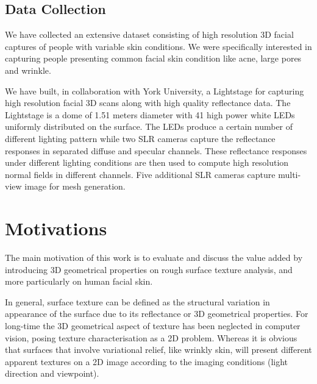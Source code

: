 \subsection{Data Collection}\label{intro_data_collection}
We have collected an extensive dataset consisting of high resolution 3D facial captures of people with variable skin conditions. We were specifically interested in capturing people presenting common facial skin condition like acne, large pores and wrinkle.

We have built, in collaboration with York University, a Lightstage for capturing high resolution facial 3D scans along with high quality reflectance data. The Lightstage is a dome of 1.51 meters diameter with 41 high power white LEDs uniformly distributed on the surface. The LEDs produce a certain number of different lighting pattern while two SLR cameras capture the reflectance responses in separated diffuse and specular channels. These reflectance responses under different lighting conditions are then used to compute high resolution normal fields in different channels. Five additional SLR cameras capture multi-view image for mesh generation. 


\section{Motivations}
The main motivation of this work is to evaluate and discuss the value added by introducing 3D geometrical properties on rough surface texture analysis, and more particularly on human facial skin.

In general, surface texture can be defined as the structural variation in appearance of the surface due to its reflectance or 3D geometrical properties. For long-time the 3D geometrical aspect of texture has been neglected in computer vision, posing texture characterisation as a 2D problem. Whereas it is obvious that surfaces that involve variational relief, like wrinkly skin, will present different apparent textures on a 2D image according to the imaging conditions (light direction and viewpoint). 

